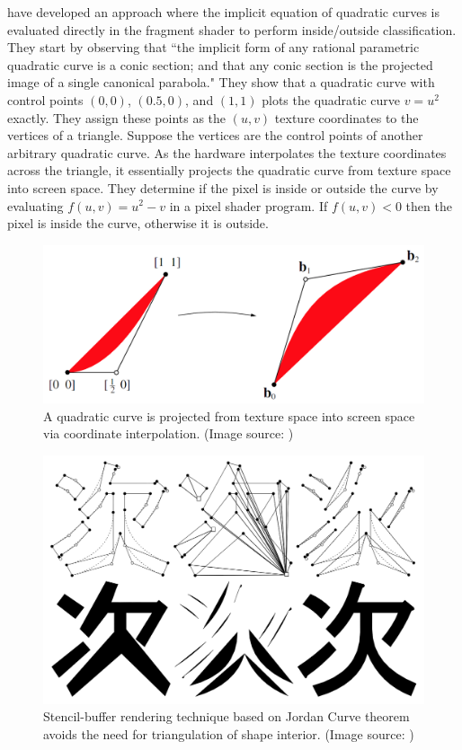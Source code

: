 \documentclass[11pt,a4paper,twoside]{article}
\begin{document}
\cite{LoopBlinn05} have developed an approach where the implicit equation of quadratic curves is evaluated directly in the fragment shader to perform inside/outside classification. They start by observing that ``the implicit form of any rational parametric quadratic curve is a conic section; and that any conic section is the projected image of a single canonical parabola." They show that a quadratic curve with control points $(0,0)$, $(0.5,0)$, and $(1,1)$ plots the quadratic curve $v = u^2$ exactly. They assign these points as the $(u,v)$ texture coordinates to the vertices of a triangle. Suppose the vertices are the control points of another arbitrary quadratic curve. As the hardware interpolates the texture coordinates across the triangle, it essentially projects the quadratic curve from texture space into screen space. They determine if the pixel is inside or outside the curve by evaluating $f(u,v) = u^2 - v$ in a pixel shader program. If $f(u,v) < 0$ then the pixel is inside the curve, otherwise it is outside.

\begin {figure}
	\centering
	\includegraphics [width=0.5\columnwidth] {figures/loop_blinn}
	\caption {A quadratic curve is projected from texture space into screen space via coordinate interpolation. (Image source: \cite{LoopBlinn05}) }
	\label {fig:loop_blinn}
\end {figure}

\begin {figure}
	\centering
	\includegraphics [width=0.5\columnwidth] {figures/kokojima}
	\caption {Stencil-buffer rendering technique based on Jordan Curve theorem avoids the need for triangulation of shape interior. (Image source: \cite{Kokojima06}) }
	\label {fig:kokojima}
\end {figure}
\end{document}
